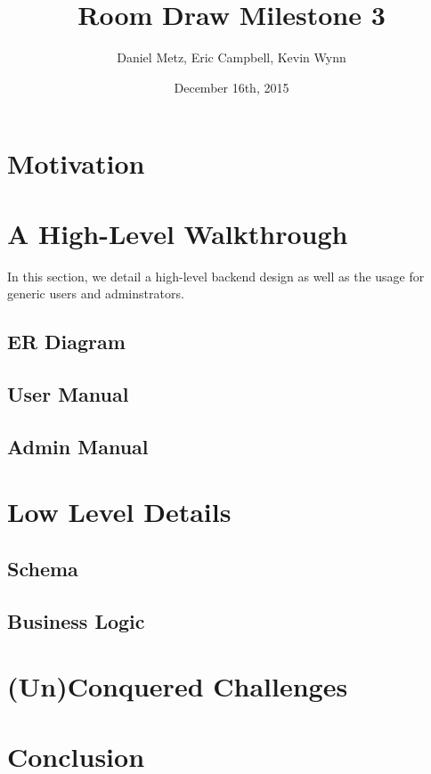 \documentclass{article}
\title{Room Draw Milestone 3}
\author{Daniel Metz, Eric Campbell, Kevin Wynn}
\date{December 16th, 2015}
\begin{document}
\maketitle

\section{Motivation}


% 

\section{A High-Level Walkthrough}
  In this section, we detail a high-level backend design as well as the usage
  for generic users and adminstrators.

  \subsection{ER Diagram}
  

  \subsection{User Manual}
  

  \subsection{Admin Manual}
  

\section{Low Level Details}
  \subsection{Schema}
  

  \subsection{Business Logic}
  

\section{(Un)Conquered Challenges}
  

\section{Conclusion}
  
\end{document}
